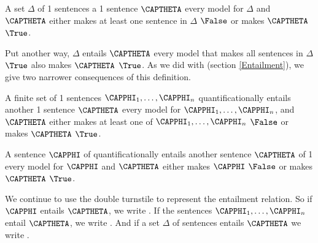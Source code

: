 \begin{majorILnc}{}
 A set $\Delta$ of \GQL{}1 sentences  a \GQL{}1 sentence $\CAPTHETA$ \Iff every model for $\Delta$ and $\CAPTHETA$ either makes at least one sentence in $\Delta$ $\False$ or makes $\CAPTHETA$ $\True$.
\end{majorILnc}

\noindent{}Put another way, $\Delta$ entails $\CAPTHETA$ \Iff every model that makes all sentences in $\Delta$ $\True$ also makes $\CAPTHETA$ $\True$.
As we did with \GSL{} (section \ref{Entailment}), we give two narrower consequences of this definition. 

\begin{cenumerate}
\item A finite set of \GQL{}1 sentences $\CAPPHI_1,\ldots,\CAPPHI_{\integer{n}}$ quantificationally entails another \GQL{}1 sentence $\CAPTHETA$ \Iff every model for $\CAPPHI_1,\ldots,\CAPPHI_{\integer{n}}$, and $\CAPTHETA$ either makes at least one of $\CAPPHI_1,\ldots,\CAPPHI_{\integer{n}}$ $\False$ or makes $\CAPTHETA$ $\True$.
\item A sentence $\CAPPHI$ of \GQL{} quantificationally entails another sentence $\CAPTHETA$ of \GQL{}1 \Iff every model for $\CAPPHI$ and $\CAPTHETA$ either makes $\CAPPHI$ $\False$ or makes $\CAPTHETA$ $\True$.
\end{cenumerate}

\noindent{}We continue to use the double turnstile to represent the entailment relation. 
So if $\CAPPHI$ entails $\CAPTHETA$, we write \mention{$\CAPPHI\sdtstile{}{}\CAPTHETA$}. 
If the sentences $\CAPPHI_1,\ldots,\CAPPHI_{\integer{n}}$ entail $\CAPTHETA$, we write .
And if a set $\Delta$ of sentences entails $\CAPTHETA$ we write \mention{$\Delta\sdtstile{}{}\CAPTHETA$}.

